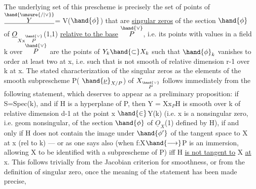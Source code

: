 
The underlying set of this prescheme is precisely the set of
points of $\underline{\overset{\hand{\unsure{/|\vee}}}{Y}}$= V($\hand{\phi}$) that are \uline{singular zeros} of the section $\hand{\phi}$ of
$\underline{O}_{X\mathrm{x}\overset{\hand{\vee}}{P}}$(1,1) \uline{relative to the base} $\overset{\hand{\vee}}{P}$, i.e. its  points with values in
a field k over $\overset{\hand{\vee}}{P}$ are the points  of $Y_k\hand{\subset} X_k$ such that 
 $\hand{\phi}_k$ vanishes to order at least two
at x, i.e. such that  is not smooth of relative dimension r-1
over k at x. The stated characterization of the  singular zeros as
the elements of the smooth subprescheme P( $\hand{\underline{\nu}}_{X/P}$) of $X_{\overset{\hand{\vee}}{P}}$ follows immediately
from the following statement, which deserves to appear as a preliminary proposition:
if S=Spec(k), and if H is a hyperplane of P, then Y = X$\mathrm{x}_P$H is
 smooth over k of
relative dimension d-1 at the point x $\hand{\in}$Y(k) (i.e. x is a nonsingular
zero, i.e. geom nonsingular, of the section $\hand{\phi}$ of $\underline{O}_X$(1) defined
by H), if and only if H does not contain the image under $\hand{\phi'}$ of the tangent
space to X at x (rel to k) --- or  as one says also
(when f:X$\hand{\longrightarrow}$P is an immersion, allowing X to be identified with a
subprescheme of P) iff H \uline{is not tangent to} X \uline{at} x. This follows
trivially from the Jacobian criterion for smoothness, or from the definition of 
singular zero, once the meaning of the statement has been made precise,
